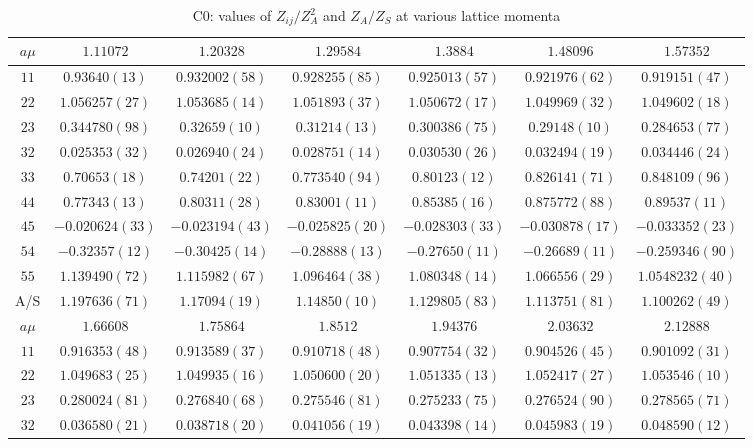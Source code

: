 \begin{table}
\begin{center}
\caption{C0: values of $Z_{ij}/Z_A^2$ and $Z_A/Z_S$ at various lattice momenta}
\begin{tabular}{c|c c c c c c}
\hline
\hline
$a\mu$ & $1.11072$ & $1.20328$ & $1.29584$ & $1.3884$ & $1.48096$ & $1.57352$ \\
\hline
$11$ & $0.93640(13)$ & $0.932002(58)$ & $0.928255(85)$ & $0.925013(57)$ & $0.921976(62)$ & $0.919151(47)$ \\
$22$ & $1.056257(27)$ & $1.053685(14)$ & $1.051893(37)$ & $1.050672(17)$ & $1.049969(32)$ & $1.049602(18)$ \\
$23$ & $0.344780(98)$ & $0.32659(10)$ & $0.31214(13)$ & $0.300386(75)$ & $0.29148(10)$ & $0.284653(77)$ \\
$32$ & $0.025353(32)$ & $0.026940(24)$ & $0.028751(14)$ & $0.030530(26)$ & $0.032494(19)$ & $0.034446(24)$ \\
$33$ & $0.70653(18)$ & $0.74201(22)$ & $0.773540(94)$ & $0.80123(12)$ & $0.826141(71)$ & $0.848109(96)$ \\
$44$ & $0.77343(13)$ & $0.80311(28)$ & $0.83001(11)$ & $0.85385(16)$ & $0.875772(88)$ & $0.89537(11)$ \\
$45$ & $-0.020624(33)$ & $-0.023194(43)$ & $-0.025825(20)$ & $-0.028303(33)$ & $-0.030878(17)$ & $-0.033352(23)$ \\
$54$ & $-0.32357(12)$ & $-0.30425(14)$ & $-0.28888(13)$ & $-0.27650(11)$ & $-0.26689(11)$ & $-0.259346(90)$ \\
$55$ & $1.139490(72)$ & $1.115982(67)$ & $1.096464(38)$ & $1.080348(14)$ & $1.066556(29)$ & $1.0548232(40)$ \\
\hline
A/S & $1.197636(71)$ & $1.17094(19)$ & $1.14850(10)$ & $1.129805(83)$ & $1.113751(81)$ & $1.100262(49)$ \\
\hline
$a\mu$ & $1.66608$ & $1.75864$ & $1.8512$ & $1.94376$ & $2.03632$ & $2.12888$ \\
\hline
$11$ & $0.916353(48)$ & $0.913589(37)$ & $0.910718(48)$ & $0.907754(32)$ & $0.904526(45)$ & $0.901092(31)$ \\
$22$ & $1.049683(25)$ & $1.049935(16)$ & $1.050600(20)$ & $1.051335(13)$ & $1.052417(27)$ & $1.053546(10)$ \\
$23$ & $0.280024(81)$ & $0.276840(68)$ & $0.275546(81)$ & $0.275233(75)$ & $0.276524(90)$ & $0.278565(71)$ \\
$32$ & $0.036580(21)$ & $0.038718(20)$ & $0.041056(19)$ & $0.043398(14)$ & $0.045983(19)$ & $0.048590(12)$ \\

\end{tabular}
\end{center}
\end{table}
